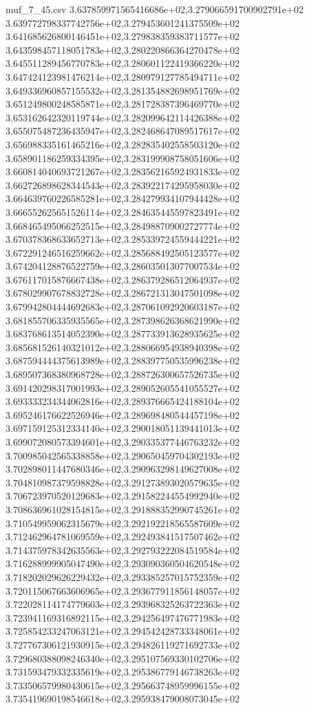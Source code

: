 \begin{filecontents*}{muf_7_45.csv}
3.637859971565416686e+02,3.279066591700902791e+02
3.639772798337742756e+02,3.279453601241375509e+02
3.641685626800146451e+02,3.279838359383711577e+02
3.643598457118051783e+02,3.280220866364270478e+02
3.645511289456770783e+02,3.280601122419366220e+02
3.647424123981476214e+02,3.280979127785494711e+02
3.649336960857155532e+02,3.281354882698951769e+02
3.651249800248585871e+02,3.281728387396469770e+02
3.653162642320119744e+02,3.282099642114426388e+02
3.655075487236435947e+02,3.282468647089517617e+02
3.656988335161465216e+02,3.282835402558503120e+02
3.658901186259334395e+02,3.283199908758051606e+02
3.660814040693721267e+02,3.283562165924931833e+02
3.662726898628344543e+02,3.283922174295958030e+02
3.664639760226585281e+02,3.284279934107944428e+02
3.666552625651526114e+02,3.284635445597823491e+02
3.668465495066252515e+02,3.284988709002727774e+02
3.670378368633652713e+02,3.285339724559444221e+02
3.672291246516259662e+02,3.285688492505123577e+02
3.674204128876522759e+02,3.286035013077007534e+02
3.676117015876667438e+02,3.286379286512064937e+02
3.678029907678832728e+02,3.286721313047501098e+02
3.679942804444692683e+02,3.287061092920603187e+02
3.681855706335935565e+02,3.287398626368621990e+02
3.683768613514052390e+02,3.287733913628935625e+02
3.685681526140321012e+02,3.288066954938940398e+02
3.687594444375613989e+02,3.288397750535996238e+02
3.689507368380968728e+02,3.288726300657526735e+02
3.691420298317001993e+02,3.289052605541055527e+02
3.693333234344062816e+02,3.289376665424188104e+02
3.695246176622526946e+02,3.289698480544457198e+02
3.697159125312334140e+02,3.290018051139441013e+02
3.699072080573394601e+02,3.290335377446763232e+02
3.700985042565338858e+02,3.290650459704302193e+02
3.702898011447680346e+02,3.290963298149627008e+02
3.704810987379598828e+02,3.291273893020579635e+02
3.706723970520129683e+02,3.291582244554992940e+02
3.708636961028154815e+02,3.291888352990745261e+02
3.710549959062315679e+02,3.292192218565587609e+02
3.712462964781069559e+02,3.292493841517507462e+02
3.714375978342635563e+02,3.292793222084519584e+02
3.716288999905047490e+02,3.293090360504620548e+02
3.718202029626229432e+02,3.293385257015752359e+02
3.720115067663606965e+02,3.293677911856148057e+02
3.722028114174779603e+02,3.293968325263722363e+02
3.723941169316892115e+02,3.294256497476771983e+02
3.725854233247063121e+02,3.294542428733348061e+02
3.727767306121930915e+02,3.294826119271692733e+02
3.729680388098246340e+02,3.295107569330102706e+02
3.731593479332335619e+02,3.295386779146738263e+02
3.733506579980430615e+02,3.295663748959996155e+02
3.735419690198546618e+02,3.295938479008073045e+02

\end{filecontents*}
